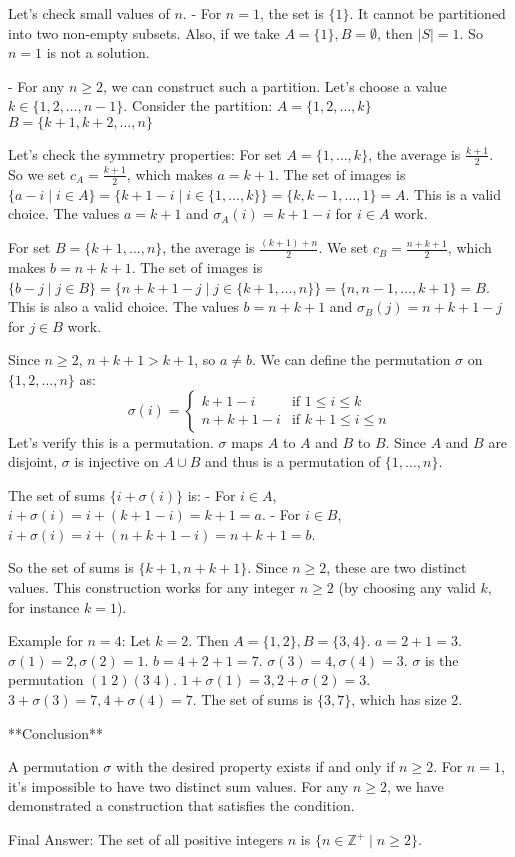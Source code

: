 Let's check small values of $n$.
- For $n=1$, the set is $\{1\}$. It cannot be partitioned into two non-empty subsets. Also, if we take $A=\{1\}, B=\emptyset$, then $|S|=1$. So $n=1$ is not a solution.

- For any $n \ge 2$, we can construct such a partition.
Let's choose a value $k \in \{1, 2, \dots, n-1\}$. Consider the partition:
$A = \{1, 2, \dots, k\}$
$B = \{k+1, k+2, \dots, n\}$

Let's check the symmetry properties:
For set $A = \{1, \dots, k\}$, the average is $\frac{k+1}{2}$. So we set $c_A = \frac{k+1}{2}$, which makes $a = k+1$.
The set of images is $\{a-i \mid i \in A\} = \{k+1-i \mid i \in \{1,\dots,k\}\} = \{k, k-1, \dots, 1\} = A$.
This is a valid choice. The values $a=k+1$ and $\sigma_A(i)=k+1-i$ for $i \in A$ work.

For set $B = \{k+1, \dots, n\}$, the average is $\frac{(k+1)+n}{2}$. We set $c_B = \frac{n+k+1}{2}$, which makes $b=n+k+1$.
The set of images is $\{b-j \mid j \in B\} = \{n+k+1-j \mid j \in \{k+1,\dots,n\}\} = \{n, n-1, \dots, k+1\} = B$.
This is also a valid choice. The values $b=n+k+1$ and $\sigma_B(j)=n+k+1-j$ for $j \in B$ work.

Since $n \ge 2$, $n+k+1 > k+1$, so $a \ne b$.
We can define the permutation $\sigma$ on $\{1, 2, \dots, n\}$ as:
$$ \sigma(i) = \begin{cases} k+1-i & \text{if } 1 \le i \le k \\ n+k+1-i & \text{if } k+1 \le i \le n \end{cases} $$
Let's verify this is a permutation. $\sigma$ maps $A$ to $A$ and $B$ to $B$. Since $A$ and $B$ are disjoint, $\sigma$ is injective on $A \cup B$ and thus is a permutation of $\{1, \dots, n\}$.

The set of sums $\{i+\sigma(i)\}$ is:
- For $i \in A$, $i+\sigma(i) = i+(k+1-i)=k+1=a$.
- For $i \in B$, $i+\sigma(i) = i+(n+k+1-i)=n+k+1=b$.

So the set of sums is $\{k+1, n+k+1\}$. Since $n \ge 2$, these are two distinct values.
This construction works for any integer $n \ge 2$ (by choosing any valid $k$, for instance $k=1$).

Example for $n=4$:
Let $k=2$. Then $A=\{1,2\}, B=\{3,4\}$.
$a=2+1=3$. $\sigma(1)=2, \sigma(2)=1$.
$b=4+2+1=7$. $\sigma(3)=4, \sigma(4)=3$.
$\sigma$ is the permutation $(1\;2)(3\;4)$.
$1+\sigma(1)=3, 2+\sigma(2)=3$.
$3+\sigma(3)=7, 4+\sigma(4)=7$.
The set of sums is $\{3,7\}$, which has size 2.

**Conclusion**

A permutation $\sigma$ with the desired property exists if and only if $n \ge 2$. For $n=1$, it's impossible to have two distinct sum values. For any $n \ge 2$, we have demonstrated a construction that satisfies the condition.

Final Answer: The set of all positive integers $n$ is $\{n \in \mathbb{Z}^+ \mid n \ge 2\}$.